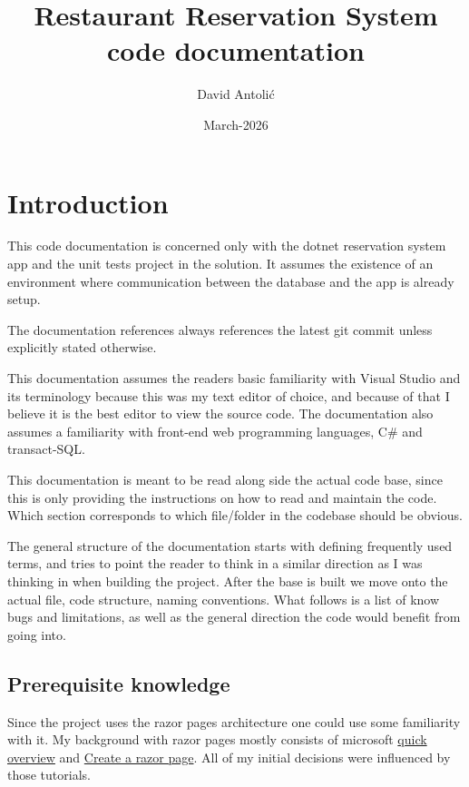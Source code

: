 \documentclass[12pt, a4paper]{article}
\title{Restaurant Reservation System code documentation}
\author{David Antolić}
\date{March-2026}
\begin{document}
\maketitle
\tableofcontents

\section{Introduction}
This code documentation is concerned only with the dotnet reservation system app and the unit tests project in the solution. It assumes the existence of an environment where communication between the database and the app is already setup. 

The documentation references always references the latest git commit unless explicitly stated otherwise.

This documentation assumes the readers basic familiarity with Visual Studio and its terminology because this was my text editor of choice, and because of that I believe it is the best editor to view the source code. The documentation also assumes a familiarity with front-end web programming languages, C\# and transact-SQL.

This documentation is meant to be read along side the actual code base, since this is only providing the instructions on how to read and maintain the code. Which section corresponds to which file/folder in the codebase should be obvious.

The general structure of the documentation starts with defining frequently used terms, and tries to point the reader to think in a similar direction as I was thinking in when building the project. After the base is built we move onto the actual file, code structure, naming conventions. What follows is a list of know bugs and limitations, as well as the general direction the code would benefit from going into.

\subsection{Prerequisite knowledge}
Since the project uses the razor pages architecture one could use some familiarity with it. My background with razor pages mostly consists of microsoft \href{https://learn.microsoft.com/en-us/aspnet/core/razor-pages/?view=aspnetcore-10.0&tabs=visual-studio}{quick overview} and \href{https://learn.microsoft.com/en-us/aspnet/core/razor-pages/?view=aspnetcore-10.0&tabs=visual-studio}{Create a razor page}. All of my initial decisions were influenced by those tutorials.
\end{document}
